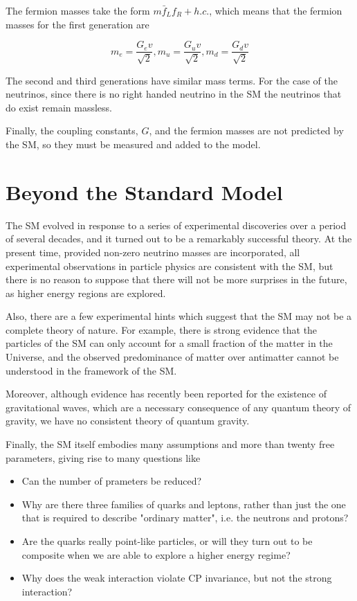 	The fermion masses take the form $m\bar{f}_{L}f_{R} + h.c.$, which means that the fermion masses for the first generation are

		\begin{equation}
		m_{e} = \frac{G_{e}v}{\sqrt{2}}, m_{u}=\frac{G_{u}v}{\sqrt{2}}, m_{d}=\frac{G_{d}v}{\sqrt{2}} 
		\end{equation}

	The second and third generations have similar mass terms. For the case of the neutrinos, since there is no right handed neutrino in the SM the neutrinos that do exist remain massless.
	
	Finally, the coupling constants, $G$, and the fermion masses are not predicted by the SM, so they must be measured and added to the model.

\section{Beyond the Standard Model}

The SM evolved in response to a series of experimental discoveries over a period of several decades, and it turned out to be a remarkably successful theory. At the present time, provided non-zero neutrino masses are incorporated, all experimental observations in particle physics are consistent with the SM, but there is no reason to suppose that there will not be more surprises in the future, as higher energy regions are explored.

Also, there are a few experimental hints which suggest that the SM may not be a complete theory of nature. For example, there is strong evidence that the particles of the SM can only account for a small fraction of the matter in the Universe, and the observed predominance of matter over antimatter cannot be understood in the framework of the SM.

Moreover, although evidence has recently been reported for the existence of gravitational waves, which are a necessary consequence of any quantum theory of gravity, we have no consistent theory of quantum gravity.

Finally, the SM itself embodies many assumptions and more than twenty free parameters, giving rise to many questions like

\begin{itemize}
 \item Can the number of prameters be reduced?
 \item Why are there three families of quarks and leptons, rather than just the one that is required to describe "ordinary matter", i.e. the neutrons and protons?
 \item Are the quarks really point-like particles, or will they turn out to be composite when we are able to explore a higher energy regime?
 \item Why does the weak interaction violate CP invariance, but not the strong interaction?
\end{itemize}

